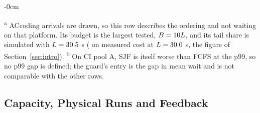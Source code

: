 \begin{table}[htbp]
\begin{adjustwidth}{-\extralength}{0cm}
\vspace{2pt}
\begin{minipage}{\fulllength}
\footnotesize
\textsuperscript{a} ACcoding arrivals are drawn, so this row describes the ordering and not
waiting on that platform. Its budget is the largest tested, $B = 10L$, and its tail
share is simulated with $L = 30.5$ s ( on measured cost at $L =
30.0$ s, the figure of Section~\ref{sec:intro}).
\textsuperscript{b} On CI pool A, SJF is itself worse than FCFS at the p99, so no p99 gap is
defined; the guard's entry is the gap in mean wait and is not comparable with the other
rows.
\end{minipage}
\end{adjustwidth}
\end{table}

\subsection{Capacity, Physical Runs and Feedback}
\label{sec:exp_physical}
\label{sec:exp_sens}

